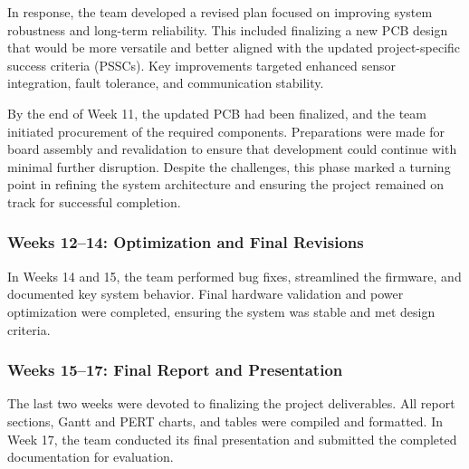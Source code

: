 \documentclass[12pt]{article}
\begin{document}
In response, the team developed a revised plan focused on improving system robustness and long-term reliability. This included finalizing a new PCB design that would be more versatile and better aligned with the updated project-specific success criteria (PSSCs). Key improvements targeted enhanced sensor integration, fault tolerance, and communication stability.

By the end of Week 11, the updated PCB had been finalized, and the team initiated procurement of the required components. Preparations were made for board assembly and revalidation to ensure that development could continue with minimal further disruption. Despite the challenges, this phase marked a turning point in refining the system architecture and ensuring the project remained on track for successful completion.

\subsubsection*{Weeks 12–14: Optimization and Final Revisions}
In Weeks 14 and 15, the team performed bug fixes, streamlined the firmware, and documented key system behavior. Final hardware validation and power optimization were completed, ensuring the system was stable and met design criteria.

\subsubsection*{Weeks 15–17: Final Report and Presentation}
The last two weeks were devoted to finalizing the project deliverables. All report sections, Gantt and PERT charts, and tables were compiled and formatted. In Week 17, the team conducted its final presentation and submitted the completed documentation for evaluation.

\end{document}
